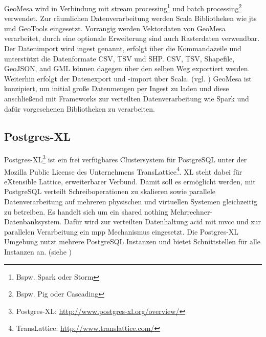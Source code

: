 GeoMesa wird in Verbindung mit stream processing\footnote{Bspw. Spark oder Storm} und batch processing\footnote{Bspw. Pig oder Cascading} verwendet.
Zur räumlichen Datenverarbeitung werden Scala Bibliotheken wie \Gls{jts} und GeoTools eingesetzt.
Vorrangig werden Vektordaten von GeoMesa verarbeitet, durch eine optionale Erweiterung sind auch Rasterdaten verwendbar.
Der Datenimport wird ingest genannt, erfolgt über die Kommandazeile und unterstützt die Datenformate CSV, TSV und SHP.
CSV, TSV, Shapefile, GeoJSON, and GML können dagegen über den selben Weg exportiert werden.
Weiterhin erfolgt der Datenexport und -import über Scala. (vgl. \cite{website:geomesa-ingest})
GeoMesa ist konzipiert, um initial große Datenmengen per Ingest zu laden und diese anschließend mit Frameworks zur verteilten Datenverarbeitung wie Spark und dafür vorgesehenen Bibliotheken zu verarbeiten.

\subsection{Postgres-XL}
\label{grundlagen:postgresxl}
Postgres-XL\footnote{Postgres-XL: \url{http://www.postgres-xl.org/overview/}} ist ein frei verfügbares Clustersystem für PostgreSQL unter der Mozilla Public License des Unternehmens TransLattice\footnote{TransLattice: \url{http://www.translattice.com/}}.
XL steht dabei für eXtensible Lattice, erweiterbarer Verbund.
Damit soll es ermöglicht werden, mit PostgreSQL verteilt Schreiboperationen zu skalieren sowie parallele Datenverarbeitung auf mehreren physischen und virtuellen Systemen gleichzeitig zu betreiben.
Es handelt sich um ein shared nothing Mehrrechner-Datenbanksystem.
Dafür wird zur verteilten Datenhaltung \Gls{acid} mit \Gls{mvcc} und zur parallelen Verarbeitung ein \Gls{mpp} Mechanismus eingesetzt.
Die Postgres-XL Umgebung nutzt mehrere PostgreSQL Instanzen und bietet Schnittstellen für alle Instanzen an. (siehe \cite{website:postgresxl-about})

